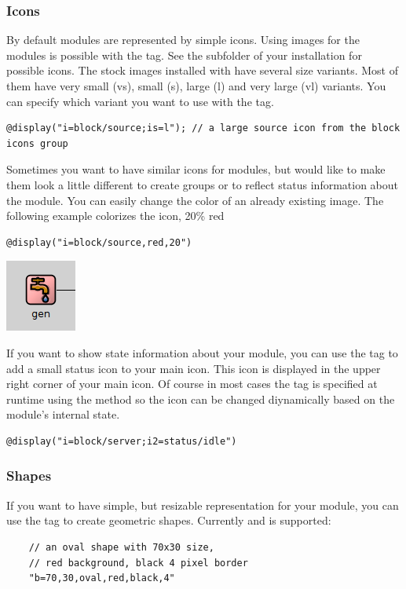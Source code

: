 \subsubsection{Icons}
By default modules are represented by simple icons.
Using images for the modules is possible with the  tag.
See the  subfolder of your {\opp} installation for possible
icons. The stock images installed with {\opp} have several size variants.
Most of them have very small (vs), small (s), large (l) and
very large (vl) variants. You can specify which variant you want to use with
the  tag.
\begin{verbatim}
@display("i=block/source;is=l"); // a large source icon from the block icons group
\end{verbatim}

Sometimes you want to have similar icons for modules, but would like to
make them look a little different to create groups or to reflect status
information about the module. You can easily change the color of an already existing image.
The following example colorizes the  icon, 20\% red
\begin{verbatim}
@display("i=block/source,red,20")
\end{verbatim}

\begin{center}
\includegraphics{figures/graphics-itag}
\end{center}

If you want to show state information about your module, you can use the  tag to
add a small status icon to your main icon. This icon is displayed in the upper right corner
of your main icon. Of course in most cases the  tag is specified at runtime using
the  method so the icon can be changed diynamically based on the
module's internal state.
\begin{verbatim}
@display("i=block/server;i2=status/idle")
\end{verbatim}

\subsubsection{Shapes}
If you want to have simple, but resizable representation for your module, you can use
the  tag to create geometric shapes. Currently  and 
 is supported:
\begin{verbatim}
    // an oval shape with 70x30 size,
    // red background, black 4 pixel border
    "b=70,30,oval,red,black,4"
\end{verbatim}

